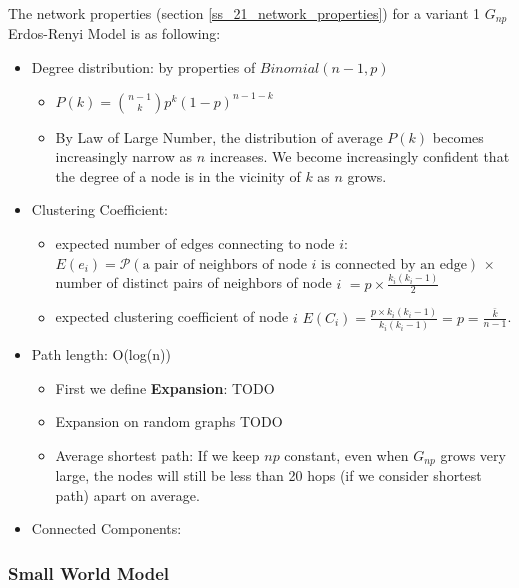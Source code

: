\noindent The network properties (section \ref{ss_21_network_properties}) for a variant 1 $G_{np}$ Erdos-Renyi Model is as following:
\begin{itemize}
    \item Degree distribution: by properties of $Binomial(n-1,p)$
        \begin{itemize}
            \item $P(k) = {n-1 \choose k} p^k (1-p)^{n-1-k}$  
            \item By Law of Large Number, the distribution of average $P(k)$ becomes increasingly narrow as $n$ increases. We become increasingly confident that the degree of a node is in the vicinity of $k$ as $n$ grows.
        \end{itemize} 
    \item Clustering Coefficient:
        \begin{itemize}
            \item expected number of edges connecting to node $i$: $E(e_i) = \mathcal{P}(\text{a pair of neighbors of node } i \text{ is connected by an edge})$ $\times$ number of distinct pairs of neighbors of node $i$  $= p \times \frac{k_i (k_i -1)}{2}$
            \item expected clustering coefficient of node $i$ $E(C_i) = \frac{p \times k_i(k_i - 1)}{k_i(k_i - 1)} = p = \frac{\bar{k}}{n-1}$. 
        \end{itemize} 
    \item Path length: O(log(n))
        \begin{itemize}
                \item First we define \textbf{Expansion}: {\color{red} TODO }

                \item Expansion on random graphs  {\color{red} TODO }
                \item Average shortest path: If we keep $np$ constant, even when $G_{np}$ grows very large, the nodes will still be less than 20 hops (if we consider shortest path) apart on average.
            \end{itemize} 
    
    
    \item Connected Components:
    

\end{itemize}

\subsubsection{Small World Model}


